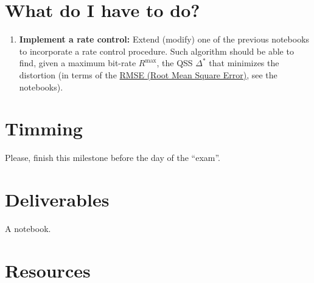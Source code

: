 \section{What do I have to do?}
\begin{enumerate}
\item \textbf{Implement a rate control:} Extend (modify) one of the
  previous notebooks to incorporate a rate control procedure. Such
  algorithm should be able to find, given a maximum bit-rate
  $R^\text{max}$, the QSS $\Delta^*$ that minimizes the distortion (in
  terms of the
  \href{https://en.wikipedia.org/wiki/Root-mean-square_deviation}{RMSE
    (Root Mean Square Error)}, see the notebooks).
\end{enumerate}

\section{Timming}
Please, finish this milestone before the day of the ``exam''.

\section{Deliverables}
A notebook.

\section{Resources}
\renewcommand{\addcontentsline}[3]{} %



